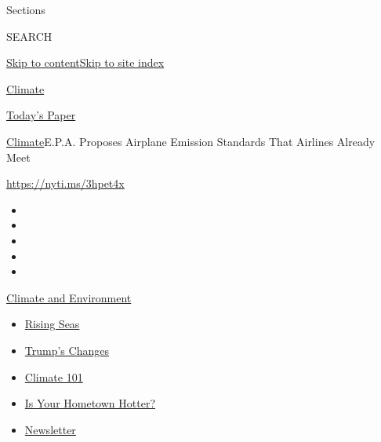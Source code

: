 Sections

SEARCH

\protect\hyperlink{site-content}{Skip to
content}\protect\hyperlink{site-index}{Skip to site index}

\href{https://www.nytimes3xbfgragh.onion/section/climate}{Climate}

\href{https://myaccount.nytimes3xbfgragh.onion/auth/login?response_type=cookie\&client_id=vi}{}

\href{https://www.nytimes3xbfgragh.onion/section/todayspaper}{Today's
Paper}

\href{/section/climate}{Climate}\textbar{}E.P.A. Proposes Airplane
Emission Standards That Airlines Already Meet

\url{https://nyti.ms/3hpet4x}

\begin{itemize}
\item
\item
\item
\item
\item
\end{itemize}

\href{https://www.nytimes3xbfgragh.onion/section/climate?action=click\&pgtype=Article\&state=default\&region=TOP_BANNER\&context=storylines_menu}{Climate
and Environment}

\begin{itemize}
\tightlist
\item
  \href{https://www.nytimes3xbfgragh.onion/2020/07/30/climate/sea-level-inland-floods.html?action=click\&pgtype=Article\&state=default\&region=TOP_BANNER\&context=storylines_menu}{Rising
  Seas}
\item
  \href{https://www.nytimes3xbfgragh.onion/interactive/2020/climate/trump-environment-rollbacks.html?action=click\&pgtype=Article\&state=default\&region=TOP_BANNER\&context=storylines_menu}{Trump's
  Changes}
\item
  \href{https://www.nytimes3xbfgragh.onion/interactive/2020/04/19/climate/climate-crash-course-1.html?action=click\&pgtype=Article\&state=default\&region=TOP_BANNER\&context=storylines_menu}{Climate
  101}
\item
  \href{https://www.nytimes3xbfgragh.onion/interactive/2018/08/30/climate/how-much-hotter-is-your-hometown.html?action=click\&pgtype=Article\&state=default\&region=TOP_BANNER\&context=storylines_menu}{Is
  Your Hometown Hotter?}
\item
  \href{https://www.nytimes3xbfgragh.onion/newsletters/climate-change?action=click\&pgtype=Article\&state=default\&region=TOP_BANNER\&context=storylines_menu}{Newsletter}
\end{itemize}

